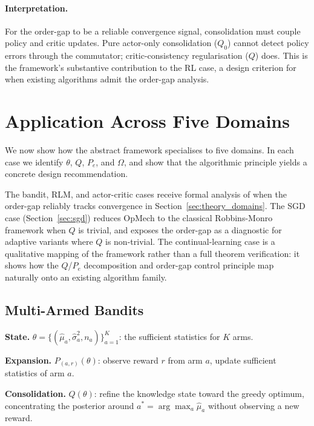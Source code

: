 \documentclass[12pt,a4paper]{article}
\newcommand{\Ogap}{\Omega}
\begin{document}
\paragraph{Interpretation.}
For the order-gap to be a reliable convergence signal, consolidation must
couple policy and critic updates. Pure actor-only consolidation ($Q_0$)
cannot detect policy errors through the commutator; critic-consistency
regularisation ($Q$) does. This is the framework's substantive contribution
to the RL case, a design criterion for when existing algorithms admit the
order-gap analysis.

\section{Application Across Five Domains}
\label{sec:domains}

We now show how the abstract framework specialises to five domains. In each
case we identify $\theta$, $Q$, $P_e$, and $\Ogap$, and show that the
algorithmic principle yields a concrete design recommendation.

The bandit, RLM, and actor-critic cases receive formal analysis of when the
order-gap reliably tracks convergence in Section~\ref{sec:theory_domains}.
The SGD case (Section~\ref{sec:sgd}) reduces OpMech to the classical
Robbins-Monro framework when $Q$ is trivial, and exposes the order-gap as a
diagnostic for adaptive variants where $Q$ is non-trivial. The
continual-learning case is a qualitative mapping of the framework rather
than a full theorem verification: it shows how the $Q$/$P_e$ decomposition
and order-gap control principle map naturally onto an existing algorithm
family.

\subsection{Multi-Armed Bandits}
\label{sec:bandits}

\textbf{State.}
$\theta = \{(\hat\mu_a, \hat\sigma_a^2, n_a)\}_{a=1}^K$: the sufficient
statistics for $K$ arms.

\textbf{Expansion.}
$P_{(a,r)}(\theta)$: observe reward $r$ from arm $a$, update sufficient
statistics of arm $a$.

\textbf{Consolidation.}
$Q(\theta)$: refine the knowledge state toward the greedy optimum, concentrating
the posterior around $a^* = \arg\max_a \hat\mu_a$ without observing a new
reward.
\end{document}
